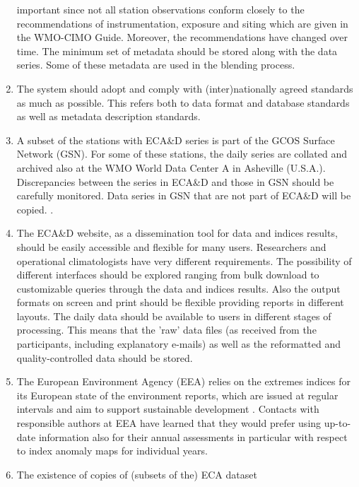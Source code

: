 \documentclass[a4paper,11pt]{article}
\begin{document}
\begin{enumerate}
      important since not all station observations conform closely to
      the recommendations of instrumentation, exposure and siting
      which are given in the WMO-CIMO Guide. Moreover, the
      recommendations have changed over time. The minimum set of
      metadata should be stored along with the data series. Some of
      these metadata are used in the blending process.
\item The system should adopt and comply with (inter)nationally agreed
      standards as much as possible. This refers both to data format
      and database standards as well as metadata description
      standards.
\item A subset of the stations with ECA\&D series is part of the GCOS
      Surface Network (GSN). For some of these stations, the daily
      series are collated and archived also at the WMO World Data
      Center A in Asheville (U.S.A.). Discrepancies between the series
      in ECA\&D and those in GSN should be carefully monitored. Data
      series in GSN that are not part of ECA\&D will be
      copied. %
      \citep{camuffo}.
\item The ECA\&D website, as a dissemination tool for data and indices
      results, should be easily accessible and flexible for many
      users. Researchers and operational climatologists have very
      different requirements. The possibility of different interfaces
      should be explored ranging from bulk download to customizable
      queries through the data and indices results. Also the output
      formats on screen and print should be flexible providing reports
      in different layouts. The daily data should be available to
      users in different stages of processing. This means that the
      'raw' data files (as received from the participants, including
      explanatory e-mails) as well as the reformatted and
      quality-controlled data should be stored.
\item The European Environment Agency (EEA) relies on the extremes
      indices for its European state of the environment reports, which
      are issued at regular intervals and aim to support sustainable
      development \citep{eea}. Contacts with responsible authors at
      EEA have learned that they would prefer using up-to-date
      information also for their annual assessments in particular with
      respect to index anomaly maps for individual years.
\item The existence of copies of (subsets of the) ECA dataset

\end{enumerate}
\end{document}
